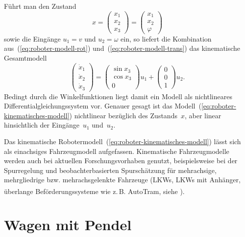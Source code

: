 Führt man den Zustand 
\[
x=\left(\begin{array}{c}
x_{1}\\
x_{2}\\
x_{3}
\end{array}\right)=\left(\begin{array}{c}
x_{1}\\
x_{2}\\
\varphi
\end{array}\right)
\]
sowie die Eingänge $u_{1}=v$ und $u_{2}=\omega$ ein, so liefert
die Kombination aus~(\ref{eq:roboter-modell-rot}) und~(\ref{eq:roboter-modell-trans})
das kinematische Gesamtmodell 
\begin{equation}
\left(\begin{array}{c}
\dot{x}_{1}\\
\dot{x}_{2}\\
\dot{x}_{3}
\end{array}\right)=\left(\begin{array}{c}
\sin x_{3}\\
\cos x_{3}\\
0
\end{array}\right)u_{1}+\left(\begin{array}{c}
0\\
0\\
1
\end{array}\right)u_{2}.\label{eq:roboter-kinematisches-modell}
\end{equation}
Bedingt durch die Winkelfunktionen liegt damit ein Modell als nichtlineares
Differentialgleichungssystem vor. Genauer gesagt ist das Modell~(\ref{eq:roboter-kinematisches-modell})
nichtlinear bezüglich des Zustands~$x$, aber linear hinsichtlich
der Eingänge~$u_{1}$ und~$u_{2}$.

Das kinematische Robotermodell~(\ref{eq:roboter-kinematisches-modell})
lässt sich als einachsiges Fahrzeugmodell aufgefassen. Kinematische
Fahrzeugmodelle werden auch bei aktuellen Forschungsvorhaben genutzt,
beispielsweise bei der Spurregelung und beobachterbasierten Spurschätzung
für mehrachsige, mehrgliedrige bzw. mehr\-achs\-gelenkte Fahrzeuge
(LKWs, LKWs mit Anhänger, überlange Beförderungssysteme wie z.\,B.
AutoTram\textsuperscript{\textregistered}, siehe \cite{huber2012ssd,nitzsche2014ecc,riesmeier2016}).

\section{Wagen mit Pendel\label{subsec:Wagen-mit-Pendel}}

